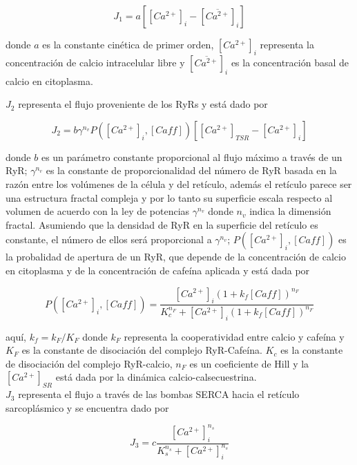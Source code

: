 \documentclass[draft]{article}
\newcommand{\Cal}{[Ca^{2+}]_{SR}}
\begin{document}
\begin{equation}
J_{1}=a\left[[Ca^{2+}]_i - [\overline{Ca^{2+}}]_i\right]
\end{equation}

donde $a$ es la constante cinética de primer orden, $[Ca^{2+}]_i$ representa la concentración de calcio intracelular libre y $[\overline{Ca^{2+}}]_i$ es la concentración basal de calcio en citoplasma.

$J_{2}$ representa el flujo proveniente de los RyRs y está dado por

\begin{equation}
J_2=b\gamma^{n_v}P\left([Ca^{2+}]_i,[Caff]\right)\left[[Ca^{2+}]_{TSR}-[Ca^{2+}]_i\right]
\end{equation}

donde $b$ es un parámetro constante proporcional al flujo máximo a través de un RyR; $\gamma^{n_v}$ es la constante de proporcionalidad del número de RyR basada en la razón entre los volúmenes de la célula y del retículo, además el retículo parece ser una estructura fractal compleja y por lo tanto su superficie escala respecto al volumen de acuerdo con la ley de potencias $\gamma^{n_v}$ donde $n_v$ indica la dimensión fractal. Asumiendo que la densidad de RyR en la superficie del retículo es constante, el número de ellos será proporcional a $\gamma^{n_v}$; $P\left([Ca^{2+}]_i,[Caff]\right)$ es la probalidad de apertura de un RyR, que depende de la concentración de calcio en citoplasma y de la concentración de cafeína aplicada y está dada por

\begin{equation}
P\left([Ca^{2+}]_i, [Caff]\right)=\frac{[Ca^{2+}]_i\left(1 + k_f[Caff]\right)^{n_F}}{K^{n_F}_c + [Ca^{2+}]_i\left(1+k_f[Caff]\right)^{n_F}}
\end{equation}

aquí, $k_f = k_F/K_F$ donde $k_F$ representa la cooperatividad entre calcio y cafeína y $K_F$ es la constante de disociación del complejo RyR-Cafeína. $K_c$ es la constante de disociación del complejo RyR-calcio, $n_F$ es un coeficiente de Hill y la $\Cal$ está dada por la dinámica calcio-calsecuestrina. \\

$J_3$ representa el flujo a través de las bombas SERCA hacia el retículo sarcoplásmico y se encuentra dado por

\begin{equation}
J_3= c\frac{[Ca^{2+}]^{n_s}_i}{K^{n_s}_s+[Ca^{2+}]^{n_s}_i}
\end{equation}
\end{document}
